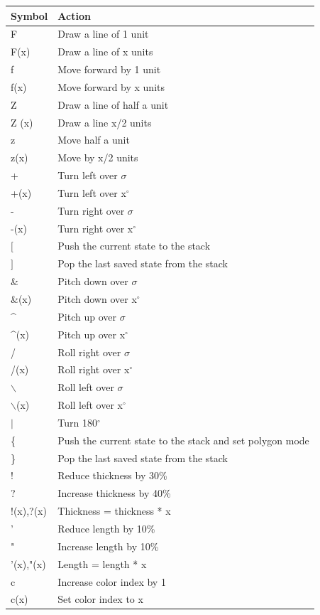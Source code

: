 \documentclass[11pt,a4paper]{article}
\newcommand{\degree}{\ensuremath{^\circ}}
\begin{document}
\begin{center}
\begin{tabular}{l | l}
Symbol & Action \\ \hline
F & Draw a line of 1 unit \\
F(x) & Draw a line of x units \\
f & Move forward by 1 unit \\
f(x) & Move forward by x units \\
Z & Draw a line of half a unit \\
Z (x) & Draw a line x/2 units \\
z & Move half a unit \\
z(x) & Move by x/2 units \\
+ & Turn left over $\sigma$ \\
+(x) & Turn left over x\degree \\
- & Turn right over $\sigma$ \\
-(x) & Turn right over x\degree \\
$[$ & Push the current state to the stack \\
$]$ & Pop the last saved state from the stack \\
\& & Pitch down over $\sigma$ \\
\&(x) & Pitch down over x\degree \\
\^{} & Pitch up over $\sigma$ \\
\^{}(x) & Pitch up over x\degree \\
/ & Roll right over $\sigma$ \\
/(x) & Roll right over x\degree \\
$\backslash$ & Roll left over $\sigma$ \\
$\backslash$(x) & Roll left over x\degree \\
$\vert$  & Turn 180\degree \\
\{ & Push the current state to the stack and set polygon mode \\
\} & Pop the last saved state from the stack \\
! & Reduce thickness by 30\% \\
? & Increase thickness by 40\% \\
!(x),?(x) & Thickness = thickness * x \\
' & Reduce length by 10\% \\
" & Increase length by 10\% \\
'(x),"(x) & Length = length * x \\
c & Increase color index by 1 \\
c(x) & Set color index to x \\
\end{tabular}
\end{center}
\end{document}
